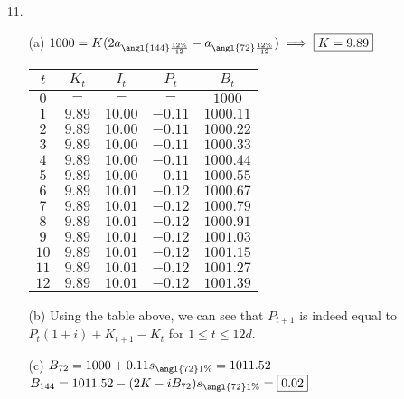 \documentclass{article}
\begin{document}
\begin{itemize}
	\item [11.]
	      \begin{itemize}
		      \item [(a)] $1000=K(2a_{\angl{144}\frac{12\%}{12}}-a_{\angl{72}\frac{12\%}{12}})\implies \boxed{K=9.89}$\\
		            \begin{tabular}{|c|c|c|c|c|}
			            \hline
			            $t$  & $K_t$  & $I_t$   & $P_t$   & $B_t$     \\
			            \hline
			            $0$  & $-$    & $-$     & $-$     & $1000$    \\
			            \hline
			            $1$  & $9.89$ & $10.00$ & $-0.11$ & $1000.11$ \\
			            \hline
			            $2$  & $9.89$ & $10.00$ & $-0.11$ & $1000.22$ \\
			            \hline
			            $3$  & $9.89$ & $10.00$ & $-0.11$ & $1000.33$ \\
			            \hline
			            $4$  & $9.89$ & $10.00$ & $-0.11$ & $1000.44$ \\
			            \hline
			            $5$  & $9.89$ & $10.00$ & $-0.11$ & $1000.55$ \\
			            \hline
			            $6$  & $9.89$ & $10.01$ & $-0.12$ & $1000.67$ \\
			            \hline
			            $7$  & $9.89$ & $10.01$ & $-0.12$ & $1000.79$ \\
			            \hline
			            $8$  & $9.89$ & $10.01$ & $-0.12$ & $1000.91$ \\
			            \hline
			            $9$  & $9.89$ & $10.01$ & $-0.12$ & $1001.03$ \\
			            \hline
			            $10$ & $9.89$ & $10.01$ & $-0.12$ & $1001.15$ \\
			            \hline
			            $11$ & $9.89$ & $10.01$ & $-0.12$ & $1001.27$ \\
			            \hline
			            $12$ & $9.89$ & $10.01$ & $-0.12$ & $1001.39$ \\
			            \hline
		            \end{tabular}
		      \item [(b)] Using the table above, we can see that $P_{t+1}$ is indeed equal to $P_t(1+i)+K_{t+1}-K_t$ for $1\leq t\leq 12d$.
		      \item [(c)] $B_{72}=1000+0.11s_{\angl{72}1\%}=1011.52$\\$B_{144}=1011.52-(2K-iB_{72})s_{\angl{72}1\%}=\boxed{0.02}$

\end{itemize}
\end{itemize}
\end{document}
